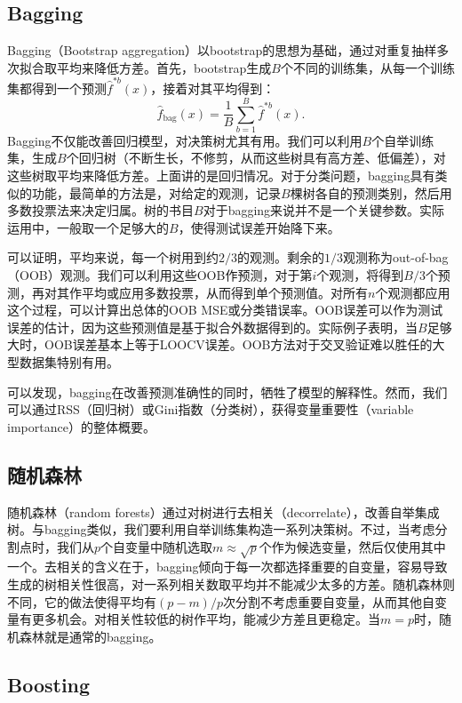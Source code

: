 \documentclass[hyperref,]{ctexart}
\begin{document}
\subsection{Bagging}\label{bagging}

Bagging（Bootstrap
aggregation）以bootstrap的思想为基础，通过对重复抽样多次拟合取平均来降低方差。首先，bootstrap生成\(B\)个不同的训练集，从每一个训练集都得到一个预测\(\hat{f}^{*b}(x)\)，接着对其平均得到：
\[\hat{f}_{\mathrm{bag}}(x)=\frac{1}{B}\sum_{b=1}^B \hat{f}^{*b}(x).\]
Bagging不仅能改善回归模型，对决策树尤其有用。我们可以利用\(B\)个自举训练集，生成\(B\)个回归树（不断生长，不修剪，从而这些树具有高方差、低偏差），对这些树取平均来降低方差。上面讲的是回归情况。对于分类问题，bagging具有类似的功能，最简单的方法是，对给定的观测，记录\(B\)棵树各自的预测类别，然后用多数投票法来决定归属。树的书目\(B\)对于bagging来说并不是一个关键参数。实际运用中，一般取一个足够大的\(B\)，使得测试误差开始降下来。

可以证明，平均来说，每一个树用到约\(2/3\)的观测。剩余的\(1/3\)观测称为out-of-bag（OOB）观测。我们可以利用这些OOB作预测，对于第\(i\)个观测，将得到\(B/3\)个预测，再对其作平均或应用多数投票，从而得到单个预测值。对所有\(n\)个观测都应用这个过程，可以计算出总体的OOB
MSE或分类错误率。OOB误差可以作为测试误差的估计，因为这些预测值是基于拟合外数据得到的。实际例子表明，当\(B\)足够大时，OOB误差基本上等于LOOCV误差。OOB方法对于交叉验证难以胜任的大型数据集特别有用。

可以发现，bagging在改善预测准确性的同时，牺牲了模型的解释性。然而，我们可以通过RSS（回归树）或Gini指数（分类树），获得变量重要性（variable
importance）的整体概要。

\subsection{随机森林}

随机森林（random
forests）通过对树进行去相关（decorrelate），改善自举集成树。与bagging类似，我们要利用自举训练集构造一系列决策树。不过，当考虑分割点时，我们从\(p\)个自变量中随机选取\(m\approx \sqrt{p}\)个作为候选变量，然后仅使用其中一个。去相关的含义在于，bagging倾向于每一次都选择重要的自变量，容易导致生成的树相关性很高，对一系列相关数取平均并不能减少太多的方差。随机森林则不同，它的做法使得平均有\((p-m)/p\)次分割不考虑重要自变量，从而其他自变量有更多机会。对相关性较低的树作平均，能减少方差且更稳定。当\(m=p\)时，随机森林就是通常的bagging。

\subsection{Boosting}\label{boosting}
\end{document}
